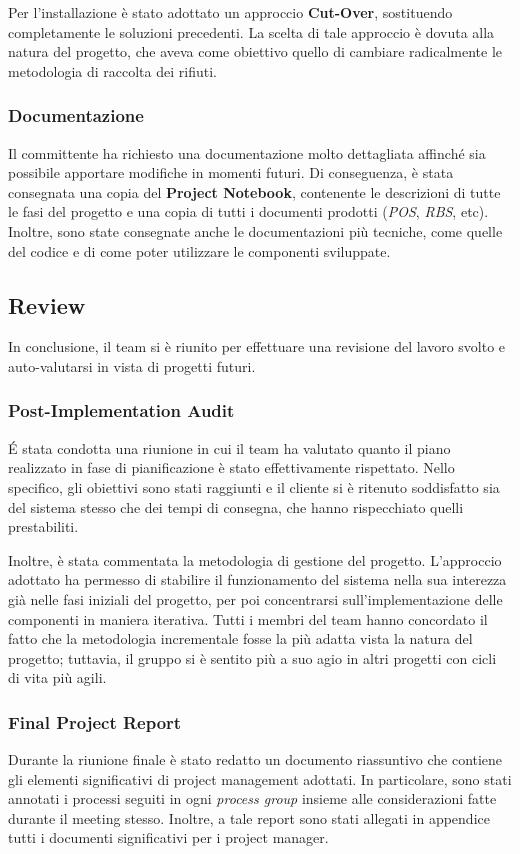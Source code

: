 Per l'installazione è stato adottato un approccio \textbf{Cut-Over}, sostituendo completamente le soluzioni precedenti. La scelta di tale approccio è dovuta alla natura del progetto, che aveva come obiettivo quello di cambiare radicalmente le metodologia di raccolta dei rifiuti.

\subsubsection{Documentazione}
Il committente ha richiesto una documentazione molto dettagliata affinché sia possibile apportare modifiche in momenti futuri. Di conseguenza, è stata consegnata una copia del \textbf{Project Notebook}, contenente le descrizioni di tutte le fasi del progetto e una copia di tutti i documenti prodotti (\textit{POS}, \textit{RBS}, etc). Inoltre, sono state consegnate anche le documentazioni più tecniche, come quelle del codice e di come poter utilizzare le componenti sviluppate.

\subsection{Review}
In conclusione, il team si è riunito per effettuare una revisione del lavoro svolto e auto-valutarsi in vista di progetti futuri.

\subsubsection{Post-Implementation Audit}
\'E stata condotta una riunione in cui il team ha valutato quanto il piano realizzato in fase di pianificazione è stato effettivamente rispettato.
Nello specifico, gli obiettivi sono stati raggiunti e il cliente si è ritenuto soddisfatto sia del sistema stesso che dei tempi di consegna, che hanno rispecchiato quelli prestabiliti.

Inoltre, è stata commentata la metodologia di gestione del progetto. L'approccio adottato ha permesso di stabilire il funzionamento del sistema nella sua interezza già nelle fasi iniziali del progetto, per poi concentrarsi sull'implementazione delle componenti in maniera iterativa. Tutti i membri del team hanno concordato il fatto che la metodologia incrementale fosse la più adatta vista la natura del progetto; tuttavia, il gruppo si è sentito più a suo agio in altri progetti con cicli di vita più agili.

\subsubsection{Final Project Report}
Durante la riunione finale è stato redatto un documento riassuntivo che contiene gli elementi significativi di project management adottati. In particolare, sono stati annotati i processi seguiti in ogni \textit{process group} insieme alle considerazioni fatte durante il meeting stesso. Inoltre, a tale report sono stati allegati in appendice tutti i documenti significativi per i project manager.